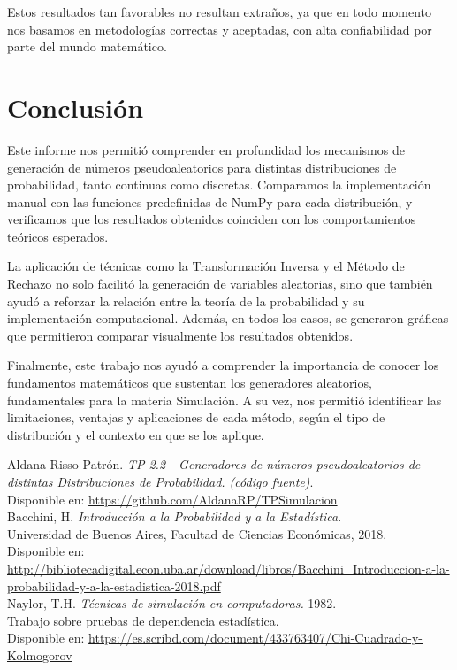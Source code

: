 \documentclass{article}
\begin{document}
Estos resultados tan favorables no resultan extraños, ya que en todo momento nos basamos en metodologías correctas y aceptadas, con alta confiabilidad por parte del mundo matemático.


\section{Conclusión}
Este informe nos permitió comprender en profundidad los mecanismos de generación de números pseudoaleatorios para distintas distribuciones de probabilidad, tanto continuas como discretas. Comparamos la implementación manual con las funciones predefinidas de NumPy para cada distribución, y verificamos que los resultados obtenidos coinciden con los comportamientos teóricos esperados.

La aplicación de técnicas como la Transformación Inversa y el Método de Rechazo no solo facilitó la generación de variables aleatorias, sino que también ayudó a reforzar la relación entre la teoría de la probabilidad y su implementación computacional. Además, en todos los casos, se generaron gráficas que permitieron comparar visualmente los resultados obtenidos.

Finalmente, este trabajo nos ayudó a comprender la importancia de conocer los fundamentos matemáticos que sustentan los generadores aleatorios, fundamentales para la materia Simulación. A su vez, nos permitió identificar las limitaciones, ventajas y aplicaciones de cada método, según el tipo de distribución y el contexto en que se los aplique.

  
\begin{thebibliography}{2}

Aldana Risso Patrón. \textit{TP 2.2 - Generadores de números pseudoaleatorios de distintas Distribuciones de Probabilidad. (código fuente)}.\\
Disponible en: \url{https://github.com/AldanaRP/TPSimulacion} \\

Bacchini, H. \textit{Introducción a la Probabilidad y a la Estadística}.\\
Universidad de Buenos Aires, Facultad de Ciencias Económicas, 2018.\\
Disponible en: \url{http://bibliotecadigital.econ.uba.ar/download/libros/Bacchini_Introduccion-a-la-probabilidad-y-a-la-estadistica-2018.pdf}\\

Naylor, T.H. \textit{Técnicas de simulación en computadoras. }1982. \\

Trabajo sobre pruebas de dependencia estadística. \\
Disponible en:
\url{https://es.scribd.com/document/433763407/Chi-Cuadrado-y-Kolmogorov}

\end{thebibliography}
\end{document}
